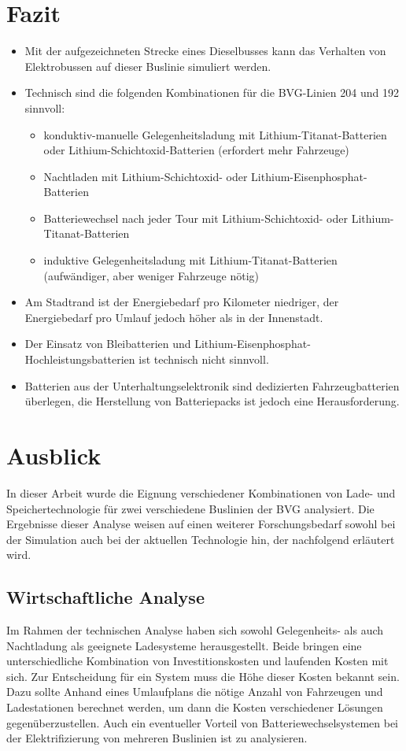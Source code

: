 \section{Fazit}
\begin{itemize}
	\item Mit der aufgezeichneten Strecke eines Dieselbusses kann das Verhalten von Elektrobussen auf dieser Buslinie simuliert werden.
	\item Technisch sind die folgenden Kombinationen für die BVG-Linien 204 und 192 sinnvoll:
	\begin{itemize}
		\item konduktiv-manuelle Gelegenheitsladung mit Lithium-Titanat-Batterien oder Lithium-Schichtoxid-Batterien (erfordert mehr Fahrzeuge)
		\item Nachtladen mit Lithium-Schichtoxid- oder Lithium-Eisenphosphat-Batterien
		\item Batteriewechsel nach jeder Tour mit Lithium-Schichtoxid- oder Lithium-Titanat-Batterien
		\item induktive Gelegenheitsladung mit Lithium-Titanat-Batterien (aufwändiger, aber weniger Fahrzeuge nötig)
	\end{itemize}
	\item Am Stadtrand ist der Energiebedarf pro Kilometer niedriger, der Energiebedarf pro Umlauf jedoch höher als in der Innenstadt.
	\item Der Einsatz von Bleibatterien und Lithium-Eisenphosphat-Hochleistungsbatterien ist technisch nicht sinnvoll.
	\item Batterien aus der Unterhaltungselektronik sind dedizierten Fahrzeugbatterien überlegen, die Herstellung von Batteriepacks ist jedoch eine Herausforderung.
\end{itemize}

\section{Ausblick}
In dieser Arbeit wurde die Eignung verschiedener Kombinationen von Lade- und Speichertechnologie für zwei verschiedene Buslinien der BVG analysiert. Die Ergebnisse dieser Analyse weisen auf einen weiterer Forschungsbedarf sowohl bei der Simulation auch bei der aktuellen Technologie hin, der nachfolgend erläutert wird.

\subsection{Wirtschaftliche Analyse}
Im Rahmen der technischen Analyse haben sich sowohl Gelegenheits- als auch Nachtladung als geeignete Ladesysteme herausgestellt. Beide bringen eine unterschiedliche Kombination von Investitionskosten und laufenden Kosten mit sich. Zur Entscheidung für ein System muss die Höhe dieser Kosten bekannt sein. Dazu sollte Anhand eines Umlaufplans die nötige Anzahl von Fahrzeugen und Ladestationen berechnet werden, um dann die Kosten verschiedener Lösungen gegenüberzustellen. Auch ein eventueller Vorteil von Batteriewechselsystemen bei der Elektrifizierung von mehreren Buslinien ist zu analysieren.

